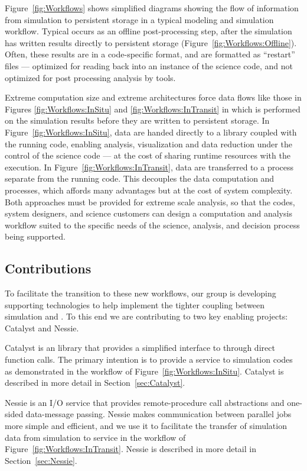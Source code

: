 Figure~\ref{fig:Workflows} shows simplified diagrams showing the flow of
information from simulation to persistent storage in a typical modeling and
simulation workflow.  Typical \vda occurs as an offline post-processing
step, after the simulation has written results directly to persistent
storage (Figure~\ref{fig:Workflows:Offline}).  Often, these results are in
a code-specific format, and are formatted as ``restart'' files ---
optimized for reading back into an instance of the science code, and not
optimized for post processing analysis by \vda tools.

Extreme computation size and extreme architectures force data flows like
those in Figures \ref{fig:Workflows:InSitu} and
\ref{fig:Workflows:InTransit} in which \vda is performed on the simulation
results before they are written to persistent storage.  In
Figure~\ref{fig:Workflows:InSitu}, data are handed directly to a \vda
library coupled with the running code, enabling analysis, visualization and
data reduction under the control of the science code --- at the cost of
sharing runtime resources with the \vda execution.  In
Figure~\ref{fig:Workflows:InTransit}, data are transferred to a \vda
process separate from the running code.  This decouples the data
computation and \vda processes, which affords many advantages but at the
cost of system complexity.  Both approaches must be provided for extreme
scale analysis, so that the codes, system designers, and science customers
can design a computation and analysis workflow suited to the specific needs
of the science, analysis, and decision process being supported.

\subsection{Contributions}

To facilitate the transition to these new workflows, our group is
developing supporting technologies to help implement the tighter coupling
between simulation and \vda.  To this end we are contributing to two key
enabling projects: Catalyst and Nessie.

Catalyst is an \insitu library that provides a simplified interface to \vda
through direct function calls.  The primary intention is to provide a \vda
service to simulation codes as demonstrated in the workflow of
Figure~\ref{fig:Workflows:InSitu}.  Catalyst is described in more detail in
Section~\ref{sec:Catalyst}.

Nessie is an I/O service that provides remote-procedure call abstractions
and one-sided data-message passing.  Nessie makes communication between
parallel jobs more simple and efficient, and we use it to facilitate the
transfer of simulation data from simulation to \vda service in the
\intransit workflow of Figure~\ref{fig:Workflows:InTransit}.  Nessie is
described in more detail in Section~\ref{sec:Nessie}.

